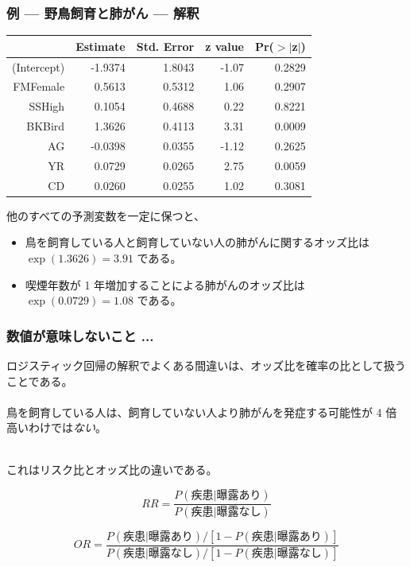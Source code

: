 
\begin{frame}
\frametitle{例 --- 野鳥飼育と肺がん --- 解釈}

\vspace{-5mm}

{\scriptsize
\begin{center}
\begin{tabular}{rrrrr}
  \hline
 & Estimate & Std. Error & z value & Pr($>$$|$z$|$) \\
  \hline
(Intercept) & -1.9374 & 1.8043 & -1.07 & 0.2829 \\
  FMFemale  & 0.5613 & 0.5312 & 1.06 & 0.2907 \\
  SSHigh    & 0.1054 & 0.4688 & 0.22 & 0.8221 \\
\rowcolor{gray}
  BKBird    & 1.3626 & 0.4113 & 3.31 & 0.0009 \\
  AG        & -0.0398 & 0.0355 & -1.12 & 0.2625 \\
\rowcolor{gray}
  YR        & 0.0729 & 0.0265 & 2.75 & 0.0059 \\
  CD        & 0.0260 & 0.0255 & 1.02 & 0.3081 \\
   \hline
\end{tabular}
\end{center}
}

他のすべての予測変数を一定に保つと、
\begin{itemize}
\item 鳥を飼育している人と飼育していない人の肺がんに関するオッズ比は $\exp(1.3626) = 3.91$ である。
\item 喫煙年数が 1 年増加することによる肺がんのオッズ比は $\exp(0.0729) = 1.08$ である。
\end{itemize}

\end{frame}


\begin{frame}
\frametitle{数値が意味しないこと ...}

ロジスティック回帰の解釈でよくある間違いは、オッズ比を確率の比として扱うことである。\\

~\\

鳥を飼育している人は、飼育していない人より肺がんを発症する可能性が 4 倍高いわけでは\emph{ない}。

~\\

これはリスク比とオッズ比の違いである。


\[RR = \frac{P(\text{疾患} | \text{曝露あり})}{P(\text{疾患} | \text{曝露なし})} \]

\[OR = \frac{P(\text{疾患} | \text{曝露あり}) / [1-P(\text{疾患} | \text{曝露あり})]}{P(\text{疾患} | \text{曝露なし})/[1-P(\text{疾患} | \text{曝露なし})]} \]


\end{frame}

